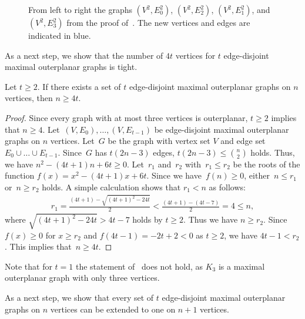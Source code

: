 \documentclass[unicode,runningheads,envcountsame,a4paper,dvipsnames,12pt]{llncs}
\begin{document}
\begin{figure}[t]
		\caption{From left to right the graphs \((V^2,E^2_0)\), \((V^2,E^2_2)\), \((V^2,E^2_1)\), and \((V^2,E^2_3)\) from the proof of~. The new vertices and edges are indicated in blue.}
		\label{fig:labeling-16}
	\end{figure}
	
	As a next step, we show that the number of \(4t\) vertices for \(t\) edge-disjoint maximal outerplanar graphs is tight.
	\begin{lemma}
		\label{lem:lower-bound}
		Let $t \ge 2$. If there exists a set of \(t\) edge-disjoint maximal outerplanar graphs on \(n\) vertices, then \(n\geq 4t\).
	\end{lemma}
	\begin{proof}
		Since every graph with at most three vertices is outerplanar, $t \ge 2$ implies that $n \ge 4$.
		Let~\((V,E_0), \dots, (V,E_{t-1})\) be edge-disjoint maximal outerplanar graphs on \(n\) vertices.
		Let~\(G\) be the graph with vertex set \(V\) and edge set \(E_0 \cup \dots \cup E_{t-1}\). 
		Since~\(G\) has \(t(2n-3)\) edges, \(t(2n-3) \le \binom{n}{2}\) holds. Thus, we have $n^{2} - (4t+1)n + 6t \ge 0$.
		Let~$r_{1}$ and~$r_{2}$ with~$r_{1} \le r_{2}$ be the roots of the function $f(x) = x^{2} - (4t+1)x + 6t$.
		Since we have~$f(n) \ge 0$, either~$n \le r_{1}$ or~$n \ge r_{2}$ holds.
		A simple calculation shows that $r_{1} < n$ as follows:
		\begin{align*}
			r_{1}
			=
			\frac{(4t+1) - \sqrt{(4t+1)^{2} - 24t}}{2}
			<
			\frac{(4t+1) - (4t-7)}{2}
			=
			4
			\le n,
		\end{align*}
		where $\sqrt{(4t+1)^{2} - 24t} > 4t - 7$ holds by $t \ge 2$.
		Thus we have $n \ge r_{2}$. Since $f(x) \ge 0$ for $x \ge r_{2}$ and $f(4t-1) = -2t+2 < 0$ as $t \ge 2$, we have $4t-1 < r_{2}$.
		This implies that~$n \ge 4t$.
	\end{proof}
	
	Note that for \(t=1\) the statement of~ does not hold, as $K_3$ is a maximal outerplanar graph with only three vertices.
	
	As a next step, we show that every set of \(t\) edge-disjoint maximal outerplanar graphs on \(n\) vertices can be extended to one on \(n+1\) vertices.
	
\end{document}
